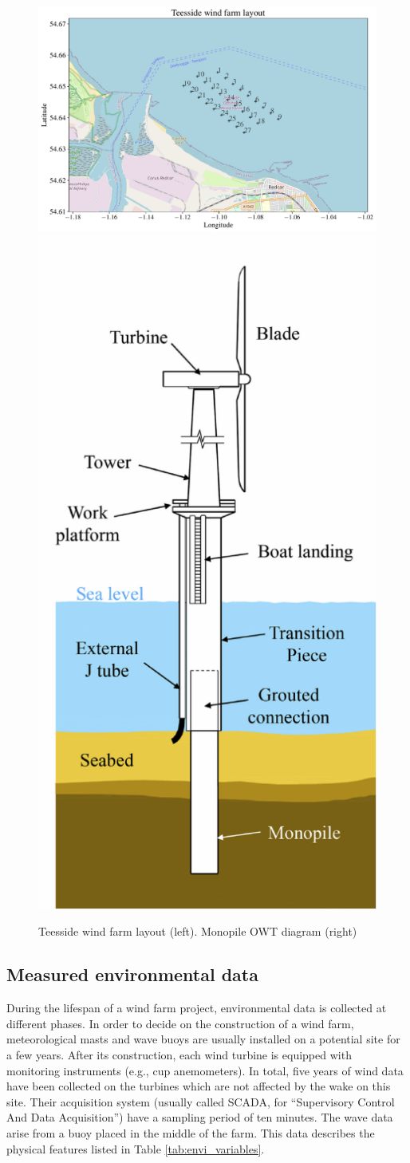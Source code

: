 \begin{figure}[!h]
\begin{center}
    \includegraphics[width=0.6\linewidth]{part2/figures/DCE/teesside/map_teesside_layout.pdf}
    \includegraphics[width=0.25\linewidth]{part2/figures/DCE/teesside/owt_diagram.pdf}
\end{center}
\caption{Teesside wind farm layout (left). Monopile OWT diagram \citep{Chen_2018_owt_diagram} (right)\label{fig:teesside_layout}}
\end{figure}

\subsection{Measured environmental data}
During the lifespan of a wind farm project, environmental data is collected at different phases. 
In order to decide on the construction of a wind farm, meteorological masts and wave buoys are usually installed on a potential site for a few years. 
After its construction, each wind turbine is equipped with monitoring instruments (e.g., cup anemometers). 
In total, five years of wind data have been collected on the turbines which are not affected by the wake on this site. 
Their acquisition system (usually called SCADA, for ``Supervisory Control And Data Acquisition'') have a sampling period of ten minutes. 
The wave data arise from a buoy placed in the middle of the farm. This data describes the physical features listed in Table \ref{tab:envi_variables}.

